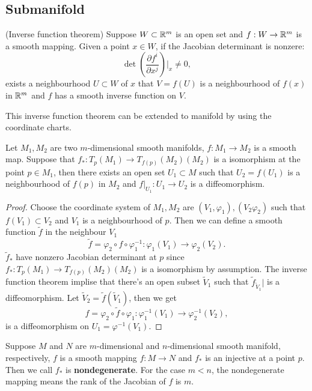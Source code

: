 \subsection{Submanifold}

\begin{theorem}(Inverse function theorem)
Suppose $W\subset\mathbb{R}^m$ is an open set and $f:W\to\mathbb{R}^m$ is a smooth mapping. Given a point $x\in W$, if the Jacobian determinant is nonzere:
\begin{equation}
\det\left(\frac{\partial f^i}{\partial x^j}\right)\bigg|_x\ne 0,
\end{equation} 
exists a neighbourhood $U\subset W$ of $x$ that $V=f(U)$ is a neighbourhood of $f(x)$ in $\mathbb{R}^m$ and $f$ has a smooth inverse function on $V$.
\end{theorem}

This inverse function theorem can be extended to manifold by using the coordinate charts.
\begin{theorem}
Let $M_1, M_2$ are two $m$-dimensional smooth manifolds, $f:M_1\to M_2$ is a smooth map. Suppose that $f_*:T_p(M_1)\to T_{f(p)}(M_2)(M_2)$ is a isomorphism at the point $p\in M_1$, then there exists an open set $U_1\subset M$ such that $U_2=f(U_1)$ is a neighbourhood of $f(p)$ in $M_2$ and $f|_{U_1}:U_1\to U_2$ is a diffeomorphism. 
\end{theorem}

\begin{proof}
Choose the coordinate system of $M_1, M_2$ are $(V_1,\varphi_1),(V_2\varphi_2)$ such that $f(V_1)\subset V_2$ and $V_1$ is a neighbourhood of $p$. Then we can define a smooth function $\tilde f$ in the neighbour $V_1$
\begin{equation}
\tilde f=\varphi_2\circ f\circ \varphi_1^{-1}:\varphi_1(V_1)\to\varphi_2(V_2).
\end{equation}
$\tilde f_*$ have nonzero Jacobian determinant at $p$ since $f_*:T_p(M_1)\to T_{f(p)}(M_2)(M_2)$ is a isomorphism by assumption. The inverse function theorem implise that there's an open subset $\tilde V_1$ such that $\tilde f_{\tilde V_1}|$ is a diffeomorphism. Let $\tilde V_2=\tilde f(\tilde V_1)$, then we get
\begin{equation}
f=\varphi_2\circ\tilde f\circ \varphi_1:\varphi^{-1}_1(V_1)\to \varphi_2^{-1}(V_2),
\end{equation}
is a diffeomorphism on $U_1=\varphi^{-1}(V_1)$.
\end{proof}

Suppose $M$ and $N$ are $m$-dimensional and $n$-dimensional smooth manifold, respectively, $f$ is a smooth mapping $f:M\to N$ and $f_*$ is an injective at a point $p$. Then we call $f_*$ is \textbf{nondegenerate}. For the case $m<n$, the nondegenerate mapping means the rank of the Jacobian of $f$ is $m$.

